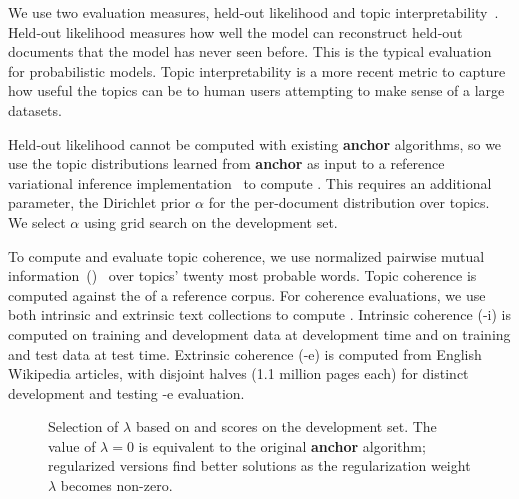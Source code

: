 We use two evaluation measures, held-out likelihood \cite[{\bf
  }]{blei-03} and topic interpretability~\cite[{\bf
  }]{chang-09b,newman-10}.  Held-out likelihood measures how
well the model can reconstruct held-out documents that the model has
never seen before.  This is the typical evaluation for probabilistic
models.  Topic interpretability is a more recent metric to capture how
useful the topics can be to human users attempting to make sense of a
large datasets.

Held-out likelihood cannot be computed with existing {\bf anchor} algorithms, so
we use the topic distributions learned from {\bf anchor} as input to a reference variational
inference implementation~\cite{blei-03} to compute {\bf {}}.
This requires an additional parameter, the Dirichlet prior
$\alpha$ for the per-document distribution over topics.  We select $\alpha$
using grid search on the development set.

To compute {\bf {}} and evaluate topic coherence, we use normalized
pairwise mutual information~()~\cite{lau-14} over topics' twenty most
probable words.  Topic coherence is computed against the  of a
reference corpus.  For coherence evaluations, we use both intrinsic and
extrinsic text collections to compute .  Intrinsic coherence
(-i) is computed on training and development data at development time
and on training and test data at test time.
Extrinsic coherence (-e) is computed from
English Wikipedia articles, with disjoint halves (1.1 million pages each) for distinct
development and testing -e evaluation.


\begin{figure}[t!]
\centering
{}
\caption{Selection of $\lambda$ based on  and 
  scores on the development set. The value of $\lambda =0$ is equivalent to the original {\bf
    anchor} algorithm; regularized versions find better solutions as
  the regularization weight $\lambda$ becomes non-zero.}
\label{fig:select-lambda}
\end{figure}


